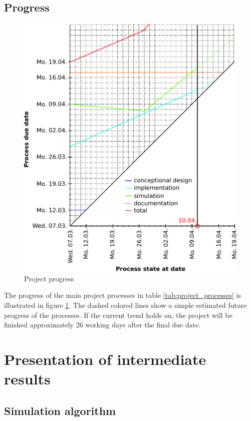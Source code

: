 \documentclass[a4paper,10pt]{article}
\begin{document}
\subsection{Progress}

\begin{figure}[h!]
 \centering
 \includegraphics[width=\linewidth]{progress.pdf}
 \caption{Project progress}
 \label{fig:project_progress}
\end{figure}

The progress of the main project processes in table \ref{tab:project_processes} is illustrated in figure \ref{fig:project_progress}. 
The dashed colored lines show a simple estimated future progress of the processes. If the current trend holds on, the project will be
finished approximately 26 working days after the final due date.


\newpage

\section{Presentation of intermediate results}
\subsection{Simulation algorithm}
\end{document}
